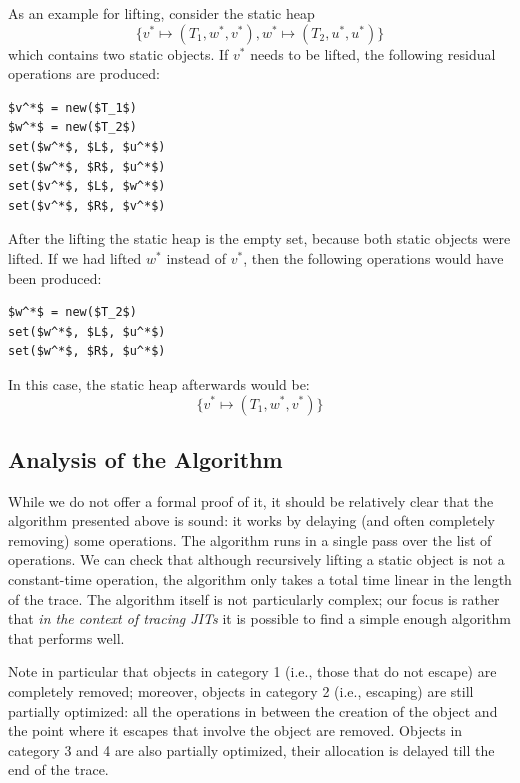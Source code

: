 \documentclass[preprint]{sigplanconf}
\newcommand\ie{i.e.,\xspace}
\begin{document}
As an example for lifting, consider the static heap $$\{v^* \mapsto (T_1, w^*,
v^*), w^* \mapsto (T_2, u^*, u^*)\}$$ which contains two static objects. If $v^*$
needs to be lifted, the following residual operations are produced:

\begin{lstlisting}[mathescape,xleftmargin=20pt]
$v^*$ = new($T_1$)
$w^*$ = new($T_2$)
set($w^*$, $L$, $u^*$)
set($w^*$, $R$, $u^*$)
set($v^*$, $L$, $w^*$)
set($v^*$, $R$, $v^*$)
\end{lstlisting}

After the lifting the static heap is the empty set, because both static objects
were lifted.
If we had lifted $w^*$ instead of $v^*$, then the following operations would
have been produced:

\begin{lstlisting}[mathescape,xleftmargin=20pt]
$w^*$ = new($T_2$)
set($w^*$, $L$, $u^*$)
set($w^*$, $R$, $u^*$)
\end{lstlisting}

In this case, the static heap afterwards would be:
$$\{v^* \mapsto (T_1, w^*, v^*)\}$$




\subsection{Analysis of the Algorithm}
\label{sub:analysis}

While we do not offer a formal proof of it, it should be relatively clear
that the algorithm presented above is sound: it works by delaying (and
often completely removing) some operations.  The algorithm runs in a
single pass over the list of operations.  We can check that although
recursively lifting a static object is not a constant-time operation,
the algorithm only takes a total time linear in the length of the trace.
The algorithm itself is not particularly complex; our focus is
rather that \emph{in the context of tracing JITs} it is possible to find a
simple enough algorithm that performs well.

Note in particular that objects in category 1 (\ie those that do
not escape) are completely removed; moreover, objects in category 2
(\ie escaping) are still partially optimized: all the operations in between the
creation of the object and the point where it escapes that involve the object
are removed. Objects in category 3 and 4 are also partially optimized, their
allocation is delayed till the end of the trace.
\end{document}
